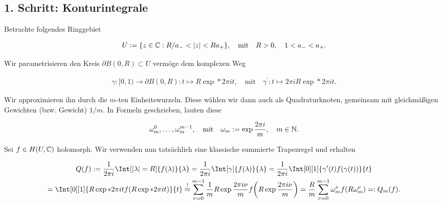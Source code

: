 \subsection*{1. Schritt: Konturintegrale}

Betrachte folgendes Ringgebiet

\begin{align*}
    U := {\left \{ z \in \mathbb{C}: R / a_- < |z| < R a_+ \right \}},
    \quad
    \text{mit}
    \quad
    R > 0,
    \quad
    1 < a_- < a_+.
\end{align*}

Wir parametrisieren den Kreis $\partial B(0, R) \subset U$ vermöge dem komplexen Weg

\begin{align*}
    \gamma: [0, 1) \to \partial B(0, R): t \mapsto R \exp*{2 \pi i t},
    \quad
    \text{mit}
    \quad
    \gamma^\prime: t \mapsto 2 \pi i R \exp*{2 \pi i t}.
\end{align*}

Wir approximieren ihn durch die $m$-ten Einheitswurzeln.
Diese wählen wir dann auch als Quadraturknoten, gemeinsam mit gleichmäßigen Gewichten (bzw. Gewicht) $1 / m$.
In Formeln geschrieben, lauten diese

\begin{align*}
    \omega_m^0, \dots, \omega_m^{m - 1},
    \quad
    \text{mit}
    \quad
    \omega_m := \exp \frac{2 \pi i}{m},
    \quad
    m \in \mathbb{N}.
\end{align*}

Sei $f \in H(U, \mathbb{C})$ holomorph.
Wir verwenden nun tatsächlich eine klassische summierte Trapezregel und erhalten

\begin{multline*}
    Q(f)
    :=
    \frac{1}{2 \pi i}
    \Int[|\lambda| = R]
    {
        f(\lambda)
    }{\lambda}
    =
    \frac{1}{2 \pi i}
    \Int[\gamma]
    {
        f(\lambda)
    }{\lambda}
    =
    \frac{1}{2 \pi i}
    \Int[0][1]
    {
        \gamma^\prime(t)
        f(\gamma(t))
    }{t} \\
    =
    \Int[0][1]
    {
        R
        \exp*{2 \pi i t}
        f(R \exp*{2 \pi i t})
    }{t}
    \stackrel{!}{\approx}
    \sum_{\nu = 0}^{m-1}
        \frac{1}{m}
        R \exp \frac{2 \pi i \nu}{m}
        f
        \pbraces
        {
            R \exp \frac{2 \pi i \nu}{m}
        }
    =
    \frac{R}{m}
    \sum_{\nu = 0}^{m-1}
        \omega_m^\nu
        f(R \omega_m^\nu)
    =:
    Q_m(f).
\end{multline*}

